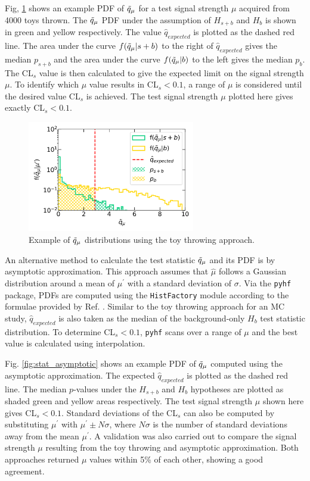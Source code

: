 Fig, \ref{fig:stat_toy} shows an example PDF of $\Tilde{q}_\mu$ for a test signal strength $\mu$ acquired from 4000 toys thrown.
The $\Tilde{q}_\mu$ PDF under the assumption of $H_{s+b}$ and $H_b$ is shown in green and yellow respectively.
The value $\hat{q}_{expected}$ is plotted as the dashed red line.
The area under the curve $f(\Tilde{q}_\mu | s + b )$ to the right of $\hat{q}_{expected}$ gives the median $p_{s+b}$ and the area under the curve $f(\Tilde{q}_\mu | b )$ to the left gives the median $p_{b}$.
The CL$_s$ value is then calculated to give the expected limit on the signal strength $\mu$. 
To identify which $\mu$ value results in CL$_s < 0.1$, a range of $\mu$ is considered until the desired value CL$_s$ is achieved.  
The test signal strength $\mu$ plotted here gives exactly CL$_s < 0.1$.
\begin{figure}[hp!] 
\centering    
\includegraphics[width=0.65\textwidth]{toy}
\caption[stat_toy]{Example of $\Tilde{q}_\mu$ distributions using the toy throwing approach.}
\label{fig:stat_toy}
\end{figure}

An alternative method to calculate the test statistic $\Tilde{q}_\mu$ and its PDF is by asymptotic approximation.
This approach assumes that $\hat{\mu}$ follows a Gaussian distribution around a mean of $\mu^{\prime}$ with a standard deviation of $\sigma$.
Via the \texttt{pyhf} package, PDFs are computed using the \texttt{HistFactory} module according to the formulae provided by Ref. \cite{asymptotic_test}.
Similar to the toy throwing approach for an MC study, $\hat{q}_{expected}$ is also taken as the median of the background-only $H_b$ test statistic distribution.
To determine CL$_s < 0.1$, \texttt{pyhf} scans over a range of $\mu$ and the best value is calculated using interpolation.

Fig. \ref{fig:stat_asymptotic} shows an example PDF of $\Tilde{q}_\mu$ computed using the asymptotic approximation.
The expected $\hat{q}_{expected}$ is plotted as the dashed red line. 
The median $p$-values under the $H_{s+b}$ and $H_b$ hypotheses are plotted as shaded green and yellow areas respectively.
The test signal strength $\mu$ shown here gives CL$_s < 0.1$.
Standard deviations of the CL$_s$ can also be computed by substituting $\mu^\prime$ with $\mu^{\prime} \pm N\sigma$, where $N\sigma$ is the number of standard deviations away from the mean $\mu^{\prime}$. 
A validation was also carried out to compare the signal strength $\mu$ resulting from the toy throwing and asymptotic approximation.
Both approaches returned $\mu$ values within 5\% of each other, showing a good agreement.

